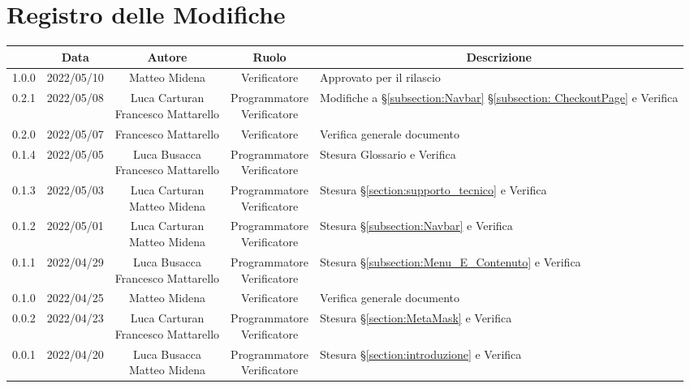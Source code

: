 \thispagestyle{empty}
\section*{Registro delle Modifiche}

\begin{center}
	\renewcommand{\arraystretch}{1.8}
	\begin{longtable}[c]{c | c | c | c | p{5cm}}
		\rowcolor[HTML]{125E28}
		\multicolumn{1}{c}{\color[HTML]{FFFFFF} \textbf{Versione}} & 
		\multicolumn{1}{c}{\color[HTML]{FFFFFF} \textbf{Data}} & 
		\multicolumn{1}{c}{\color[HTML]{FFFFFF} \textbf{Autore}} & 
		\multicolumn{1}{c}{\color[HTML]{FFFFFF} \textbf{Ruolo}} & 
		\multicolumn{1}{c}{\color[HTML]{FFFFFF} \textbf{Descrizione}} \\
		\endhead
		1.0.0 & 2022/05/10 & Matteo Midena & Verificatore & Approvato per il rilascio\\
		0.2.1 & 2022/05/08 & \Shortunderstack{Luca Carturan\\Francesco Mattarello} & \Shortunderstack{Programmatore\\Verificatore} & Modifiche a §\ref{subsection:Navbar} §\ref{subsection: CheckoutPage} e Verifica\\
		0.2.0 & 2022/05/07 & Francesco Mattarello & Verificatore & Verifica generale documento\\
		0.1.4 & 2022/05/05 & \Shortunderstack{Luca Busacca\\Francesco Mattarello} & \Shortunderstack{Programmatore\\Verificatore} & Stesura Glossario e Verifica\\
		0.1.3 & 2022/05/03 & \Shortunderstack{Luca Carturan\\Matteo Midena} & \Shortunderstack{Programmatore\\Verificatore} & Stesura §\ref{section:supporto_tecnico} e Verifica\\
		0.1.2 & 2022/05/01 & \Shortunderstack{Luca Carturan\\Matteo Midena} & \Shortunderstack{Programmatore\\Verificatore} & Stesura §\ref{subsection:Navbar} e Verifica\\
		0.1.1 & 2022/04/29 & \Shortunderstack{Luca Busacca\\Francesco Mattarello} & \Shortunderstack{Programmatore\\Verificatore} & Stesura §\ref{subsection:Menu_E_Contenuto} e Verifica\\
		0.1.0 & 2022/04/25 & Matteo Midena & Verificatore & Verifica generale documento\\
		0.0.2 & 2022/04/23 & \Shortunderstack{Luca Carturan\\Francesco Mattarello} & \Shortunderstack{Programmatore\\Verificatore} & Stesura §\ref{section:MetaMask} e Verifica\\
		0.0.1 & 2022/04/20 & \Shortunderstack{Luca Busacca\\Matteo Midena} & \Shortunderstack{Programmatore\\Verificatore} & Stesura §\ref{section:introduzione} e Verifica\\


\end{longtable}
\end{center}
